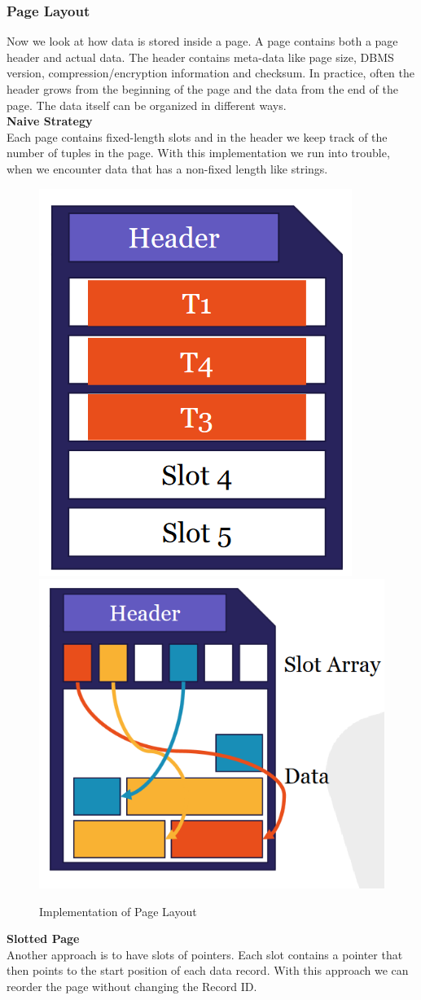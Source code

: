 \subsubsection{Page Layout}
Now we look at how data is stored inside a page. A page contains both a page header and actual data. The header contains meta-data like page size, DBMS version, compression/encryption information and checksum. In practice, often the header grows from the beginning of the page and the data from the end of the page. The data itself can be organized in different ways. \vspace{.2cm}\\
\textbf{Naive Strategy}\\
Each page contains fixed-length slots and in the header we keep track of the number of tuples in the page. With this implementation we run into trouble, when we encounter data that has a non-fixed length like strings. 
\begin{figure}[H]
\centering
\includegraphics[width=.3\textwidth]{images/naive_strategy.PNG}
\includegraphics[width=.3\textwidth]{images/slotted_page.PNG}
\label{page_layout}
\caption{Implementation of Page Layout}
\end{figure}

\noindent\textbf{Slotted Page}\\
Another approach is to have slots of pointers. Each slot contains a pointer that then points to the start position of each data record. With this approach we can reorder the page without changing the Record ID.

